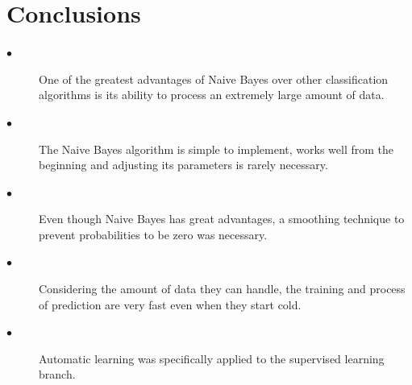 \documentclass[sigconf,12pt,review=false,natbib=false]{acmart}
\begin{document}
\section{Conclusions}

\begin{description}
    \item[$\bullet$] One of the greatest advantages of Naive Bayes over other classification algorithms is its ability
      to process an extremely large amount of data. \\
  \item[$\bullet$] The Naive Bayes algorithm is simple to implement, works well from the beginning and adjusting its
      parameters is rarely necessary. \\
  \item[$\bullet$] Even though Naive Bayes has great advantages, a smoothing technique to prevent probabilities to be
      zero was necessary. \\
  \item[$\bullet$] Considering the amount of data they can handle, the training and process of prediction are very
      fast even when they start cold. \\
  \item[$\bullet$] Automatic learning was specifically applied to the supervised learning branch. \\
\end{description}

\nocite{*}
\printbibliography
\end{document}
